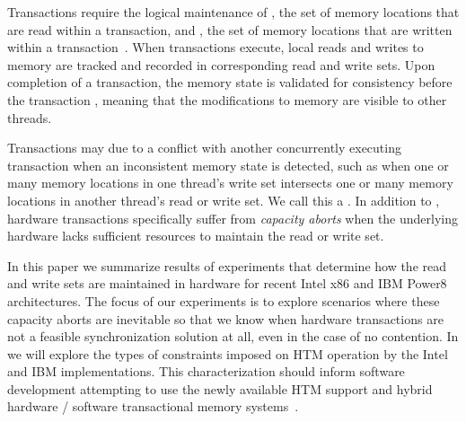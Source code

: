 Transactions require the logical 
maintenance of , the set
of memory locations that are read within a 
transaction, and , the set
of memory locations that are written within 
a transaction~\cite{HerlihyMo93}. When transactions execute, 
local reads and writes to memory 
are tracked and recorded in
corresponding read and write sets. Upon 
completion of a transaction, the memory state is validated for 
consistency before the transaction
, meaning that the modifications to 
memory are visible to other threads.

Transactions may  due to a conflict with
another concurrently executing transaction when an
inconsistent memory state is detected, 
such as when one or many memory locations
in one thread's write set intersects one or 
many memory locations in another
thread's read or write set.  We call this a
.  In addition to ,
hardware transactions specifically suffer 
from \textit{capacity aborts} when the underlying hardware
lacks sufficient resources to maintain the
read or write set.

In this paper we summarize results of experiments 
that determine how the
read and write sets are maintained in hardware for recent 
Intel x86 and IBM Power8 architectures. 
The focus of our experiments is to explore scenarios where these
capacity aborts are inevitable so that we know 
when hardware transactions are
not a feasible synchronization solution at all, 
even in the case of no contention. In 
we will explore the types of constraints imposed on
HTM operation by the Intel and IBM implementations.
This characterization should inform
software development attempting to use the newly available HTM support 
and hybrid hardware / software transactional memory
systems~\cite{DamronFeLe06,MatveevSh13}.
